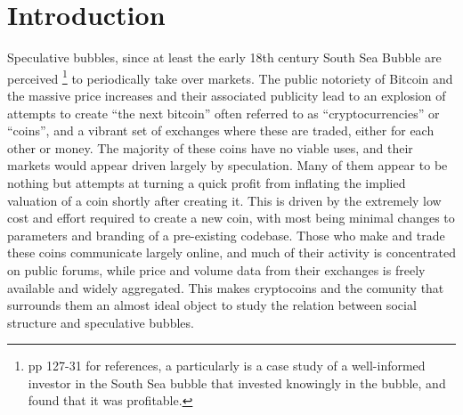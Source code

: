 \section{Introduction}

Speculative bubbles, since at least the early 18th century South Sea Bubble are perceived \footnote{\cite{garber2001famous} pp 127-31 for references, a particularly is \cite{temin2004riding} a case study of a well-informed investor in the South Sea bubble that invested knowingly in the bubble, and found that it was profitable. } to periodically take over markets. %
The public notoriety of Bitcoin and the massive price increases and their associated publicity  lead to an explosion of attempts to create ``the next bitcoin'' often referred to as ``cryptocurrencies'' or ``coins'', and a vibrant set of exchanges where these are traded, either for each other or money.
The majority of these coins have no viable uses, and their markets would appear driven largely by speculation.
Many of them appear to be nothing but attempts at turning a quick profit from inflating the implied valuation of a coin shortly after creating it.
This is driven by the extremely low cost and effort required to create a new coin, with most being minimal changes to parameters and branding of a pre-existing codebase.
Those who make and trade these coins communicate largely online, and much of their activity is concentrated on public forums, while price and volume data from their exchanges is freely available and widely aggregated.
This makes cryptocoins and the comunity that surrounds them an almost ideal object to study the relation between social structure and speculative bubbles.

